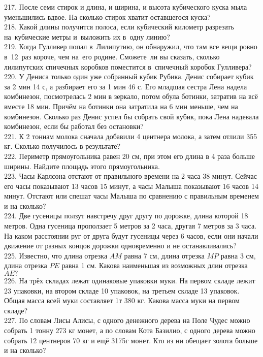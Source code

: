 217. После семи стирок и длина, и ширина, и высота кубического куска мыла уменьшились вдвое. На сколько стирок хватит оставшегося куска?\\
218. Какой длины получится полоса, если кубический километр разрезать на кубические метры и выложить их в одну линию?\\
219. Когда Гулливер попал в Лилипутию, он обнаружил, что там все вещи ровно в 12 раз короче, чем на его родине. Сможете ли вы сказать, сколько лилипутских спичечных коробков поместится в спичечный коробок Гулливера?\\
220. У Дениса только один уже собранный кубик Рубика. Денис собирает кубик за 2 мин 14 с, а разбирает его за 1 мин 46 с. Его младшая сестра Лена надела комбинезон, посмотрелась 2 мин в зеркало, потом обула ботинки, затратив на всё вместе 18 мин. Причём на ботинки она затратила на 6 мин меньше, чем на комбинезон. Сколько раз Денис успел бы собрать свой кубик, пока Лена надевала комбинезон, если бы работал без остановки?\\
221. К 2 тоннам молока сначала добавили 4 центнера молока, а затем отлили 355 кг. Сколько получилось в результате?\\
222. Периметр прямоугольника равен 20 см, при этом его длина в 4 раза больше ширины. Найдите площадь этого прямоугольника.\\
223. Часы Карлсона отстают от правильного времени на 2 часа 38 минут. Сейчас его часы показывают 13 часов 15 минут, а часы Малыша показывают 16 часов 14 минут. Отстают или спешат часы Малыша по сравнению с правильным временем и на сколько?\\
224. Две гусеницы ползут навстречу друг другу по дорожке, длина которой 18 метров. Одна гусеница проползает 5 метров за 2 часа, другая 7 метров за 3 часа. На каком расстоянии руг от друга будут гусеницы через 6 часов, если они начали движение от разных концов дорожки одновременно и не останавливались?\\
225. Известно, что длина отрезка $AM$ равна 7 см, длина отрезка $MP$ равна 3 см, длина отрезка $PE$ равна 1 см. Какова наименьшая из возможных длин отрезка $AE?$\\
226. На трёх складах лежат одинаковые упаковки муки. На первом складе лежит 23 упаковки, на втором складе 10 упаковок, на третьем складе 13 упаковок. Общая масса всей муки составляет 1т 380 кг. Какова масса муки на первом складе?\\
227. По словам Лисы Алисы, с одного денежного дерева на Поле Чудес можно собрать 1 тонну 273 кг монет, а по словам Кота Базилио, с одного дерева можно собрать 12 центнеров 70 кг и ещё 3175г монет. Кто из ни обещает золота больше и на сколько?\\
